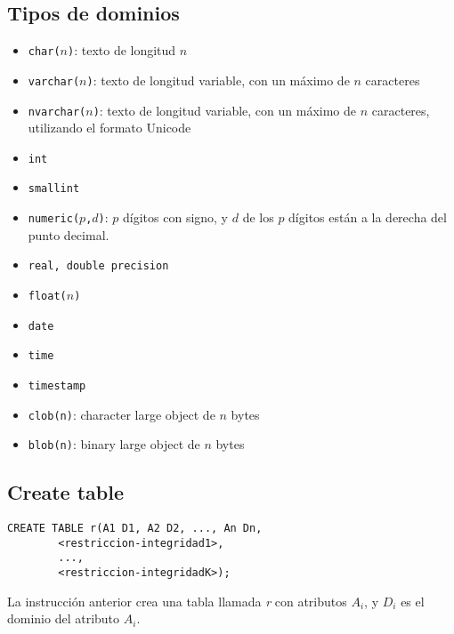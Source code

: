 \documentclass[a4paper, twoside]{article}
\begin{document}
\subsection{Tipos de dominios}
\begin{itemize}
\item \texttt{char($n$)}: texto de longitud $n$
\item \texttt{varchar($n$)}: texto de longitud variable, con un máximo
de $n$ caracteres
\item \texttt{nvarchar($n$)}: texto de longitud variable, con un máximo
de $n$ caracteres, utilizando el formato Unicode
\item \texttt{int}
\item \texttt{smallint}
\item \texttt{numeric($p$,$d$)}: $p$ dígitos con signo, y $d$ de los
$p$ dígitos están a la derecha del punto decimal.
\item \texttt{real, double precision}
\item \texttt{float($n$)}
\item \texttt{date}
\item \texttt{time}
\item \texttt{timestamp}
\item \texttt{clob(n)}: character large object de $n$ bytes
\item \texttt{blob(n)}: binary large object de $n$ bytes
\end{itemize}

\subsection{Create table}

\begin{lstlisting}
CREATE TABLE r(A1 D1, A2 D2, ..., An Dn,
		<restriccion-integridad1>,
		...,
		<restriccion-integridadK>);
\end{lstlisting}


La instrucción anterior crea una tabla llamada \emph{r} con atributos
$A_{i}$, y $D_{i}$ es el dominio del atributo $A_{i}$.
\end{document}
